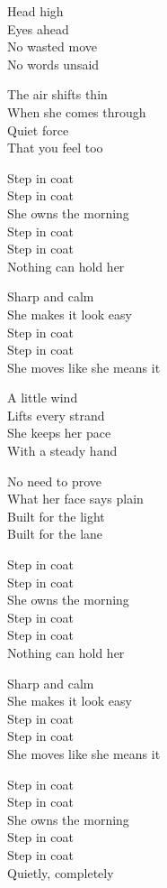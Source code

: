 \begin{lyrics}
Head high\\
Eyes ahead\\
No wasted move\\
No words unsaid

The air shifts thin\\
When she comes through\\
Quiet force\\
That you feel too

Step in coat\\
Step in coat\\
She owns the morning\\
Step in coat\\
Step in coat\\
Nothing can hold her

Sharp and calm\\
She makes it look easy\\
Step in coat\\
Step in coat\\
She moves like she means it

A little wind\\
Lifts every strand\\
She keeps her pace\\
With a steady hand

No need to prove\\
What her face says plain\\
Built for the light\\
Built for the lane

Step in coat\\
Step in coat\\
She owns the morning\\
Step in coat\\
Step in coat\\
Nothing can hold her

Sharp and calm\\
She makes it look easy\\
Step in coat\\
Step in coat\\
She moves like she means it

Step in coat\\
Step in coat\\
She owns the morning\\
Step in coat\\
Step in coat\\
Quietly, completely
\end{lyrics}

